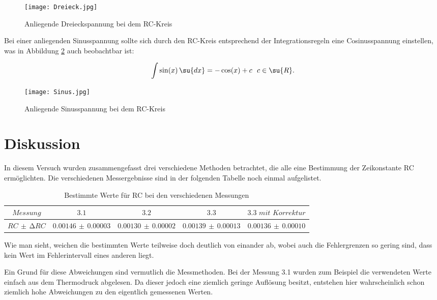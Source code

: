 \begin{figure}
  \centering
  \texttt{[image: Dreieck.jpg]}
  \caption{Anliegende Dreieckspannung bei dem RC-Kreis}
  \label{fig:Dreieck}
\end{figure}

\newpage

Bei einer anliegenden Sinusspannung sollte sich durch den RC-Kreis entsprechend
der Integrationsregeln eine Cosinusspannung einstellen, was in Abbildung \ref{fig:Sinus}
auch beobachtbar ist:

\begin{equation*}
  \int \sin(x)\, \su{dx} = - \cos(x)+c \,\,\,\, c\in \su{R}.
\end{equation*}

\begin{figure}
  \centering
  \texttt{[image: Sinus.jpg]}
  \caption{Anliegende Sinusspannung bei dem RC-Kreis}
  \label{fig:Sinus}
\end{figure}

\section{Diskussion}

In diesem Versuch wurden zusammengefasst drei verschiedene Methoden betrachtet,
die alle eine Bestimmung der Zeikonstante RC ermöglichten. Die verschiedenen
Messergebnisse sind in der folgenden Tabelle noch einmal aufgelistet.

\begin{table}
  \caption{Bestimmte Werte für RC bei den verschiedenen Messungen}
  \label{tab:Zusammenfassung}
  \begin{tabular}{c | c c c c}
    \toprule  $Messung$ & $3.1$ & $3.2$ & $3.3$ & $3.3 \,\, mit \,\, Korrektur$ \\
    \midrule  $RC \, \pm \, \increment RC$ & $0.00146 \, \pm \, 0.00003$ &
              $0.00130 \, \pm \, 0.00002$ & $0.00139 \, \pm \, 0.00013$ &
              $0.00136 \, \pm \, 0.00010$ \\
    \bottomrule
  \end{tabular}
\end{table}

Wie man sieht, weichen die bestimmten Werte teilweise doch deutlich von einander
ab, wobei auch die Fehlergrenzen so gering sind, dass kein Wert im Fehlerintervall
eines anderen liegt.

Ein Grund für diese Abweichungen sind vermutlich die Messmethoden. Bei der Messung
3.1 wurden zum Beispiel die verwendeten Werte einfach aus dem Thermodruck abgelesen.
Da dieser jedoch eine ziemlich geringe Auflösung besitzt, entstehen hier wahrscheinlich
schon ziemlich hohe Abweichungen zu den eigentlich gemessenen Werten.

